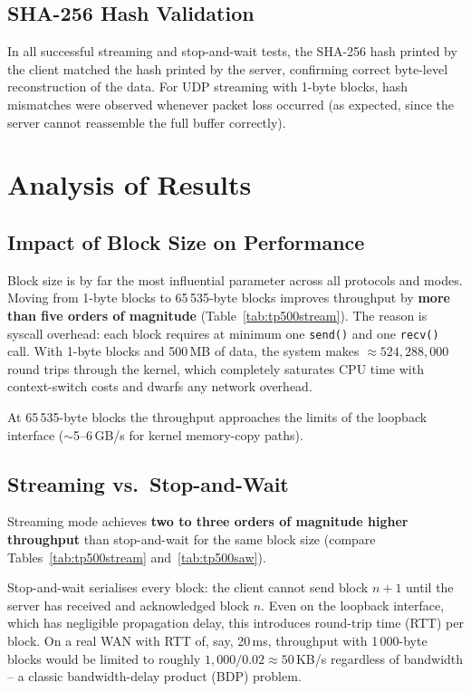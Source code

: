 \documentclass[12pt,a4paper]{article}
\begin{document}
\subsection{SHA-256 Hash Validation}

In all successful streaming and stop-and-wait tests, the SHA-256 hash
printed by the client matched the hash printed by the server, confirming
correct byte-level reconstruction of the data.  For UDP streaming with
1-byte blocks, hash mismatches were observed whenever packet loss occurred
(as expected, since the server cannot reassemble the full buffer correctly).

\section{Analysis of Results}
\label{sec:analysis}

\subsection{Impact of Block Size on Performance}

Block size is by far the most influential parameter across all protocols and
modes.  Moving from 1-byte blocks to 65\,535-byte blocks improves throughput
by \textbf{more than five orders of magnitude} (Table~\ref{tab:tp500stream}).
The reason is syscall overhead: each block requires at minimum one
\texttt{send()} and one \texttt{recv()} call.  With 1-byte blocks and 500\,MB
of data, the system makes $\approx 524{,}288{,}000$ round trips through the
kernel, which completely saturates CPU time with context-switch costs and
dwarfs any network overhead.

At 65\,535-byte blocks the throughput approaches the limits of the loopback
interface ($\sim$5--6\,GB/s for kernel memory-copy paths).

\subsection{Streaming vs.\ Stop-and-Wait}

Streaming mode achieves \textbf{two to three orders of magnitude higher
throughput} than stop-and-wait for the same block size
(compare Tables~\ref{tab:tp500stream} and~\ref{tab:tp500saw}).

Stop-and-wait serialises every block: the client cannot send block $n+1$
until the server has received and acknowledged block $n$.  Even on the
loopback interface, which has negligible propagation delay, this introduces
round-trip time (RTT) per block.  On a real WAN with RTT of, say,
20\,ms, throughput with 1\,000-byte blocks would be limited to roughly
$1{,}000 / 0.02 \approx 50$\,KB/s regardless of bandwidth -- a classic
bandwidth-delay product (BDP) problem.
\end{document}
